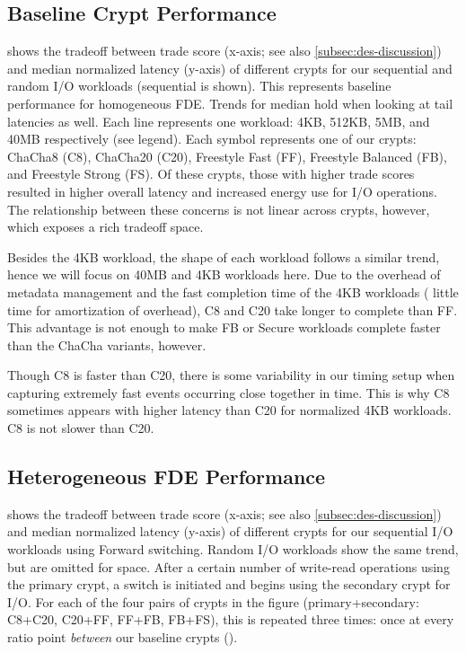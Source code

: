 \subsection{Baseline Crypt Performance}\label{subsec:eval-baseline}



 shows the tradeoff between trade score (x-axis; see
also \cref{subsec:des-discussion}) and median normalized latency (y-axis) of
different crypts for our sequential and random I/O workloads (sequential is
shown). This represents baseline performance for homogeneous FDE. Trends for
median hold when looking at tail latencies as well. Each line represents one
workload: 4KB, 512KB, 5MB, and 40MB respectively (see legend). Each symbol
represents one of our crypts: ChaCha8 (C8), ChaCha20 (C20), Freestyle Fast (FF),
Freestyle Balanced (FB), and Freestyle Strong (FS). Of these crypts, those with
higher trade scores resulted in higher overall latency and increased energy use
for I/O operations. The relationship between these concerns is not linear across
crypts, however, which exposes a rich tradeoff space.

Besides the 4KB workload, the shape of each workload follows a similar trend,
hence we will focus on 40MB and 4KB workloads here. Due to the overhead of
metadata management and the fast completion time of the 4KB workloads (\ie
little time for amortization of overhead), C8 and C20 take longer to complete
than FF. This advantage is not enough to make FB or Secure workloads complete
faster than the ChaCha variants, however.

Though C8 is faster than C20, there is some variability in our timing setup when
capturing extremely fast events occurring close together in time. This is why C8
sometimes appears with higher latency than C20 for normalized 4KB workloads. C8
is not slower than C20.


\subsection{Heterogeneous FDE Performance}\label{subsec:eval-flexible}



 shows the tradeoff between trade score (x-axis; see also
\cref{subsec:des-discussion}) and median normalized latency (y-axis) of
different crypts for our sequential I/O workloads using Forward switching.
Random I/O workloads show the same trend, but are omitted for space. After a
certain number of write-read operations using the primary crypt, a switch is
initiated and \sys begins using the secondary crypt for I/O. For each of the
four pairs of crypts in the figure (primary+secondary: C8+C20, C20+FF, FF+FB,
FB+FS), this is repeated three times: once at every ratio point {\em between}
our baseline crypts ().

